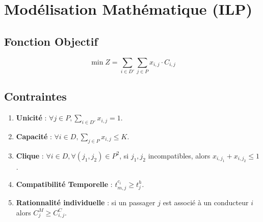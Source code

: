 \documentclass[11pt,a4paper]{article}
\begin{document}
\section{Modélisation Mathématique (ILP)}

\subsection{Fonction Objectif}
\begin{equation}
    \min Z = \sum_{i \in D'} \sum_{j \in P} x_{i,j} \cdot C_{i,j}
\end{equation}

\subsection{Contraintes}
\begin{enumerate}
    \item \textbf{Unicité} : $\forall j \in P, \sum_{i \in D'} x_{i,j} = 1$.
    \item \textbf{Capacité} : $\forall i \in D, \sum_{j \in P} x_{i,j} \le K$.
    \item \textbf{Clique} : $\forall i \in D, \forall (j_1, j_2) \in P^2$, si $j_1, j_2$ incompatibles, alors $x_{i,j_1} + x_{i,j_2} \le 1$.
    \item \textbf{Compatibilité Temporelle} : $t^{c_i}_{m, j} \geq t^{h}_j$.
    \item \textbf{Rationnalité individuelle} : si un passager $j$ est associé à un conducteur $i$ alors $C_j^M \geq C_{i, j}^C$.
\end{enumerate}
\end{document}
